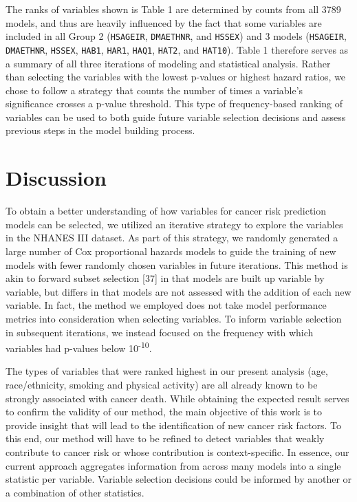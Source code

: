 \documentclass[12pt,oneside]{reedthesis}
\theoremstyle{definition}
\theoremstyle{definition}
\theoremstyle{definition}
\theoremstyle{remark}
\begin{document}
The ranks of variables shown is Table 1 are determined by counts from
all 3789 models, and thus are heavily influenced by the fact that some
variables are included in all Group 2 (\texttt{HSAGEIR},
\texttt{DMAETHNR}, and \texttt{HSSEX}) and 3 models (\texttt{HSAGEIR},
\texttt{DMAETHNR}, \texttt{HSSEX}, \texttt{HAB1}, \texttt{HAR1},
\texttt{HAQ1}, \texttt{HAT2}, and \texttt{HAT10}). Table 1 therefore
serves as a summary of all three iterations of modeling and statistical
analysis. Rather than selecting the variables with the lowest p-values
or highest hazard ratios, we chose to follow a strategy that counts the
number of times a variable's significance crosses a p-value threshold.
This type of frequency-based ranking of variables can be used to both
guide future variable selection decisions and assess previous steps in
the model building process.

\hypertarget{discussion}{%
\section*{Discussion}\label{discussion}}

To obtain a better understanding of how variables for cancer risk
prediction models can be selected, we utilized an iterative strategy to
explore the variables in the NHANES III dataset. As part of this
strategy, we randomly generated a large number of Cox proportional
hazards models to guide the training of new models with fewer randomly
chosen variables in future iterations. This method is akin to forward
subset selection {[}37{]} in that models are built up variable by
variable, but differs in that models are not assessed with the addition
of each new variable. In fact, the method we employed does not take
model performance metrics into consideration when selecting variables.
To inform variable selection in subsequent iterations, we instead
focused on the frequency with which variables had p-values below
10\textsuperscript{-10}.

The types of variables that were ranked highest in our present analysis
(age, race/ethnicity, smoking and physical activity) are all already
known to be strongly associated with cancer death. While obtaining the
expected result serves to confirm the validity of our method, the main
objective of this work is to provide insight that will lead to the
identification of new cancer risk factors. To this end, our method will
have to be refined to detect variables that weakly contribute to cancer
risk or whose contribution is context-specific. In essence, our current
approach aggregates information from across many models into a single
statistic per variable. Variable selection decisions could be informed
by another or a combination of other statistics.
\end{document}
